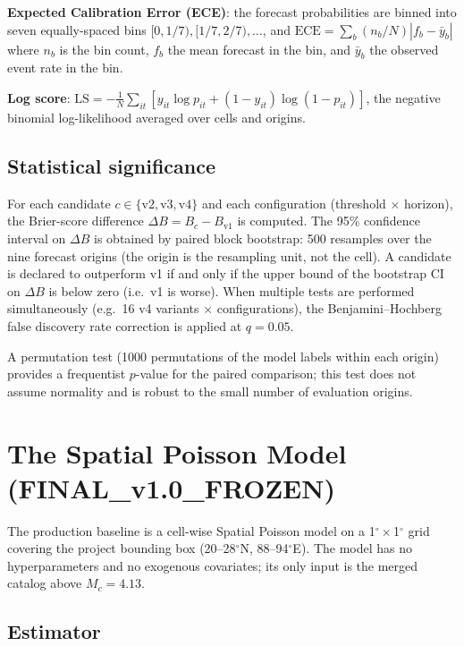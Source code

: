 \documentclass[10pt,a4paper,twocolumn]{article}
\begin{document}
\textbf{Expected Calibration Error (ECE)}: the forecast probabilities are binned into seven equally-spaced bins $[0,1/7),[1/7,2/7),\dots$, and $\text{ECE} = \sum_b (n_b/N) |f_b - \bar y_b|$ where $n_b$ is the bin count, $f_b$ the mean forecast in the bin, and $\bar y_b$ the observed event rate in the bin.

\textbf{Log score}: $\text{LS} = -\frac{1}{N}\sum_{it} [y_{it}\log p_{it} + (1-y_{it})\log(1-p_{it})]$, the negative binomial log-likelihood averaged over cells and origins.

\subsection{Statistical significance}

For each candidate $c\in\{\text{v2},\text{v3},\text{v4}\}$ and each configuration (threshold $\times$ horizon), the Brier-score difference $\Delta B = B_c - B_{\text{v1}}$ is computed. The 95\% confidence interval on $\Delta B$ is obtained by paired block bootstrap: 500 resamples over the nine forecast origins (the origin is the resampling unit, not the cell). A candidate is declared to outperform v1 if and only if the upper bound of the bootstrap CI on $\Delta B$ is below zero (i.e.\ v1 is worse). When multiple tests are performed simultaneously (e.g.\ 16 v4 variants $\times$ configurations), the Benjamini--Hochberg false discovery rate correction \cite{benjamini1995} is applied at $q=0.05$.

A permutation test (1000 permutations of the model labels within each origin) provides a frequentist $p$-value for the paired comparison; this test does not assume normality and is robust to the small number of evaluation origins.

\section{The Spatial Poisson Model (FINAL\_v1.0\_FROZEN)}\label{sec:spatial-poisson}

The production baseline is a cell-wise Spatial Poisson model on a 1$^\circ\times$1$^\circ$ grid covering the project bounding box (20--28$^\circ$N, 88--94$^\circ$E). The model has no hyperparameters and no exogenous covariates; its only input is the merged catalog above $M_c=4.13$.

\subsection{Estimator}
\end{document}
